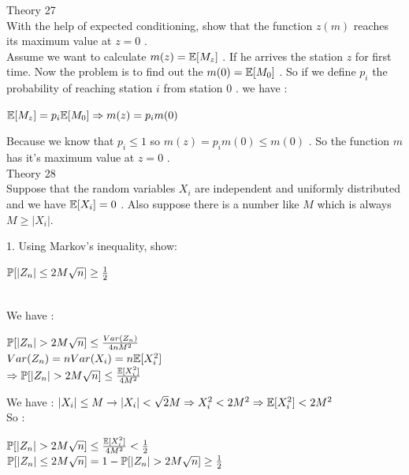 \documentclass[30pt]{article}
\begin{document}
{\Large \color{blue} Theory 27 } \\
{\color{blue} With the help of expected conditioning, show that the function $z(m)$ reaches its maximum value at $z = 0$ . 
} \\ \newline 
Assume we want to calculate $m(z) = \Bbb{E}[M_z] $ . If he arrives the station $z$ for first time. Now the problem is to find out the $ m(0) = \Bbb{E}[M_0]$ . So if we define $p_i$ the probability of reaching station $i$ from station $0$ . we have : 
\begin{center}
    $\Bbb{E}[M_z] = p_i \Bbb{E}[M_0] \Rightarrow  m(z) = p_i m(0)$
\end{center} 
Because we know that $p_i \le 1 $ so $m(z) = p_i m(0) \le m(0) $ . So the function $m$ has it's  maximum value at $z = 0$ . \\

{\Large \color{blue} Theory 28 } \\
{\color{blue} Suppose that the random variables $X_i$ are independent and uniformly distributed and we have $\Bbb{E}[X_i] = 0 $ . Also suppose there is a number like $M$ which is always $M \ge |X_i|$.
} \\ \newline 
{\color{blue} {\large 1. }Using Markov's inequality, show:
\begin{center}
    $\Bbb{P}[|Z_n| \le 2M\sqrt{n} ] \ge \frac{1}{2} $
\end{center}
} \\ \newline
We have : 
\begin{center}
    $ \Bbb{P}[|Z_n| > 2M\sqrt{n} ] \le \frac{Var(Z_n)}{4nM^2}$ \vspace{0.3cm} \\
    $Var(Z_n) = nVar(X_i)  = n \Bbb{E}[X_i^2] $ \vspace{0.3cm} \\
    $\Rightarrow \Bbb{P}[|Z_n| > 2M\sqrt{n} ] \le \frac{\Bbb{E}[X_i^2]}{4M^2} $ 
\end{center} 
We have : \hspace{0.4cm} $|X_i| \le M \rightarrow |X_i| < \sqrt{2}M \Rightarrow X_i^2 < 2M^2 \Rightarrow \Bbb{E}[X_i^2] < 2M^2 $ \\
So : 
\begin{center}
    $\Bbb{P}[|Z_n| > 2M\sqrt{n} ] \le \frac{\Bbb{E}[X_i^2]}{4M^2} < \frac{1}{2} $ \vspace{0.3cm} \\
    $\Bbb{P}[|Z_n| \le 2M\sqrt{n} ] = 1 - \Bbb{P}[|Z_n| > 2M\sqrt{n} ] \ge \frac{1}{2} $
\end{center} \\
\end{document}
